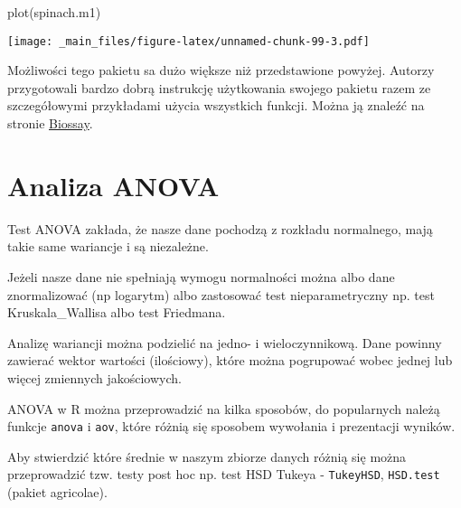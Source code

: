 \documentclass[
]{book}
\newenvironment{Shaded}{\begin{snugshade}}{\end{snugshade}}
\newcommand{\FunctionTok}[1]{\textcolor[rgb]{0.00,0.00,0.00}{#1}}
\newcommand{\NormalTok}[1]{#1}
\begin{document}
\begin{Shaded}
\begin{Highlighting}[]
\FunctionTok{plot}\NormalTok{(spinach.m1)}
\end{Highlighting}
\end{Shaded}

\texttt{[image: \_main\_files/figure-latex/unnamed-chunk-99-3.pdf]}

Możliwości tego pakietu sa dużo większe niż przedstawione powyżej. Autorzy przygotowali bardzo dobrą instrukcję użytkowania swojego pakietu razem ze szczegółowymi przykładami użycia wszystkich funkcji. Można ją znaleźć na stronie \href{http://www.bioassay.dk/}{Biossay}.

\hypertarget{analiza-anova}{%
\section{Analiza ANOVA}\label{analiza-anova}}

Test ANOVA zakłada, że nasze dane pochodzą z rozkładu normalnego, mają takie same wariancje i są niezależne.

Jeżeli nasze dane nie spełniają wymogu normalności można albo dane znormalizować (np logarytm) albo zastosować test nieparametryczny np. test Kruskala\_Wallisa albo test Friedmana.

Analizę wariancji można podzielić na jedno- i wieloczynnikową. Dane powinny zawierać wektor wartości (ilościowy), które można pogrupować wobec jednej lub więcej zmiennych jakościowych.

ANOVA w R można przeprowadzić na kilka sposobów, do popularnych należą funkcje \texttt{anova} i \texttt{aov}, które różnią się sposobem wywołania i prezentacji wyników.

Aby stwierdzić które średnie w naszym zbiorze danych różnią się można przeprowadzić tzw. testy post hoc np. test HSD Tukeya - \texttt{TukeyHSD}, \texttt{HSD.test} (pakiet agricolae).
\end{document}

